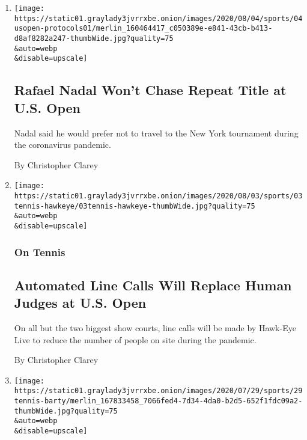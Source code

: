 \begin{enumerate}
\def\labelenumi{\arabic{enumi}.}
\item
  \href{/2020/08/04/sports/tennis/rafael-nadal-us-open.html}{}

  \texttt{[image: https://static01.graylady3jvrrxbe.onion/images/2020/08/04/sports/04usopen-protocols01/merlin\_160464417\_c050389e-e841-43cb-b413-d8af8282a247-thumbWide.jpg?quality=75\\\&auto=webp\\\&disable=upscale]}

  \hypertarget{rafael-nadal-wont-chase-repeat-title-at-us-open}{%
  \subsection{Rafael Nadal Won't Chase Repeat Title at U.S.
  Open}\label{rafael-nadal-wont-chase-repeat-title-at-us-open}}

  Nadal said he would prefer not to travel to the New York tournament
  during the coronavirus pandemic.

  By Christopher Clarey
\item
  \href{/2020/08/03/sports/tennis/us-open-hawkeye-line-judges.html}{}

  \texttt{[image: https://static01.graylady3jvrrxbe.onion/images/2020/08/03/sports/03tennis-hawkeye/03tennis-hawkeye-thumbWide.jpg?quality=75\\\&auto=webp\\\&disable=upscale]}

  \hypertarget{on-tennis}{%
  \subsubsection{On Tennis}\label{on-tennis}}

  \hypertarget{automated-line-calls-will-replace-human-judges-at-us-open}{%
  \subsection{Automated Line Calls Will Replace Human Judges at U.S.
  Open}\label{automated-line-calls-will-replace-human-judges-at-us-open}}

  On all but the two biggest show courts, line calls will be made by
  Hawk-Eye Live to reduce the number of people on site during the
  pandemic.

  By Christopher Clarey
\item
  \href{/2020/07/29/sports/tennis/ashleigh-barty-us-open.html}{}

  \texttt{[image: https://static01.graylady3jvrrxbe.onion/images/2020/07/29/sports/29tennis-barty/merlin\_167833458\_7066fed4-7d34-4da0-b2d5-652f1fdc09a2-thumbWide.jpg?quality=75\\\&auto=webp\\\&disable=upscale]}


\end{enumerate}
